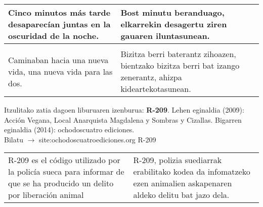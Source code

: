 \documentclass{article}
\begin{document}
\begin{center}
\begin{longtable}{|p{6cm}|p{6cm}|}
  \midrule
  Cinco minutos más tarde desaparecían juntas en la oscuridad de la noche.&
  Bost minutu beranduago, elkarrekin desagertu ziren gauaren iluntasunean.\\

  \midrule
  \cellcolor{lightgray}{\textbf{Párrafo}} &
  \cellcolor{lightgray}{\textbf{Paragrafoa}}\\
  
  \midrule
  Caminaban hacia una nueva vida, una nueva vida para las dos.&
  Bizitza berri baterantz zihoazen, bientzako bizitza berri bat izango zenerantz, ahizpa kideartekotasunean.\\
  
  \bottomrule
\end{longtable}
\end{center}


\begin{center}
  Itzulitako zatia dagoen liburuaren izenburua: \textbf{R-209}. 
  Lehen eginaldia (2009): Acción Vegana, Local Anarquista Magdalena y Sombras y Cizallas.
  Bigarren eginaldia (2014): ochodoscuatro ediciones. \\
  Bilatu $\rightarrow$ site:ochodoscuatroediciones.org R-209
\end{center}

\begin{center}
\begin{longtable}{|p{6cm}|p{6cm}|}
  \toprule
  \cellcolor{lightgray}{\textbf{R-209}} &
  \cellcolor{lightgray}{\textbf{R-209}}\\
  
  \midrule
  R-209 es el código utilizado por la policía sueca para informar de que se ha producido un delito por liberación animal&
  R-209, polizia suediarrak erabilitako kodea da infomatzeko ezen animalien askapenaren aldeko delitu bat jazo dela.\\
  
  \bottomrule
\end{longtable}
\end{center}
\end{document}
